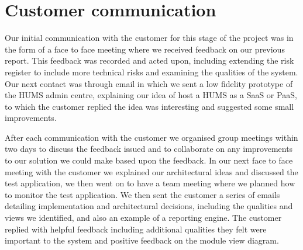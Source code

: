 \section{Customer communication}
\label{sec:communication}

Our initial communication with the customer for this stage of the project was in the form of a face to face meeting where we received feedback on our previous report. This feedback was recorded and acted upon, including extending the risk register to include more technical risks and examining the qualities of the system. Our next contact was through email in which we sent a low fidelity prototype of the HUMS admin centre, explaining our idea of host a HUMS as a SaaS or PaaS, to which the customer replied the idea was interesting and suggested some small improvements. 

After each communication with the customer we organised group meetings within two days to discuss the feedback issued and to collaborate on any improvements to our solution we could make based upon the feedback. In our next face to face meeting with the customer we explained our architectural ideas and discussed the test application, we then went on to have a team meeting where we planned how to monitor the test application. We then sent the customer a series of emails detailing implementation and architectural decisions, including the qualities and views we identified, and also an example of a reporting engine. The customer replied with helpful feedback including additional qualities they felt were important to the system and positive feedback on the module view diagram.
